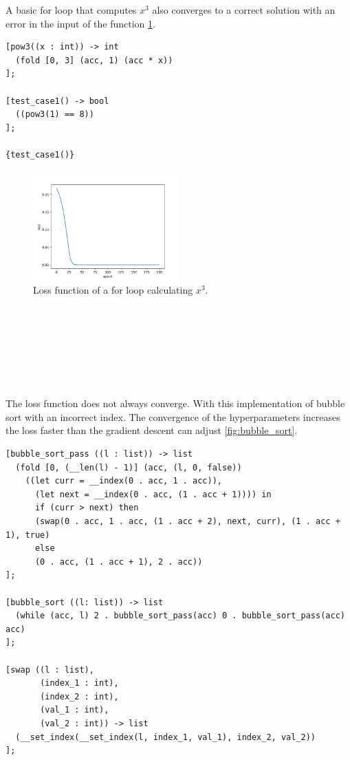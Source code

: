 \documentclass{article}
\begin{document}
\begin{minipage}{\textwidth}
A basic for loop that computes $x^3$ also converges to a correct solution with an error in the input of the function \ref{fig:for_loop}.

\begin{verbatim}
[pow3((x : int)) -> int
  (fold [0, 3] (acc, 1) (acc * x))
];

[test_case1() -> bool
  ((pow3(1) == 8))
];

{test_case1()}
\end{verbatim}
\end{minipage}
\begin{figure}[h!]
  \begin{center}
    \includegraphics[width=0.5\textwidth]{for_loop.png}
  \end{center}
  \caption{Loss function of a for loop calculating $x^3$.}
  \label{fig:for_loop}
\end{figure}\\\\\\\\\\\\
\begin{minipage}{\textwidth}
The loss function does not always converge. With this implementation of bubble sort with an incorrect index. The convergence of the hyperparameters increases the loss faster than the gradient descent can adjust \ref{fig:bubble_sort}.
\begin{verbatim}
[bubble_sort_pass ((l : list)) -> list
  (fold [0, (__len(l) - 1)] (acc, (l, 0, false))
    ((let curr = __index(0 . acc, 1 . acc)),
      (let next = __index(0 . acc, (1 . acc + 1)))) in
      if (curr > next) then
      (swap(0 . acc, 1 . acc, (1 . acc + 2), next, curr), (1 . acc + 1), true)
      else
      (0 . acc, (1 . acc + 1), 2 . acc))
];

[bubble_sort ((l: list)) -> list
  (while (acc, l) 2 . bubble_sort_pass(acc) 0 . bubble_sort_pass(acc) acc)
];

[swap ((l : list),
       (index_1 : int),
       (index_2 : int),
       (val_1 : int),
       (val_2 : int)) -> list
  (__set_index(__set_index(l, index_1, val_1), index_2, val_2))
];
\end{verbatim}
\end{minipage}
\end{document}
